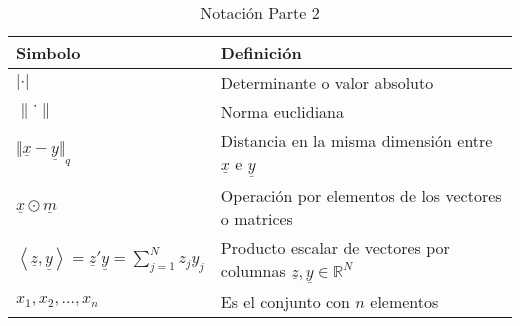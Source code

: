 \begin{table}[H]
    \begin{center}
        \begin{tabularx}{\textwidth}{|l|X|}
            \hline
            \textbf{Simbolo}                                                                                                     & \textbf{Definición}                                                                         \\
            \hline
            $ \lvert \cdot \rvert $                                                                                              & Determinante o valor absoluto                                                               \\
            $ \left\lVert \cdot \right\rVert $                                                                                   & Norma euclidiana                                                                            \\
            $ {\Vert \underline{x} - \underline{y} \Vert}_{q} $                                                                  & Distancia en la misma dimensión entre $\underline{x}$ e $\underline{y}$                     \\
            $ \underline{x} \odot \underline{m} $                                                                                & Operación por elementos de los vectores o matrices                                          \\
            $ \left\langle \underline{z}, \underline{y} \right\rangle = \underline{z}' \underline{y} = \sum_{j=1}^{N}{z_j y_j} $ & Producto escalar de vectores por columnas $\underline{z}, \underline{y} \in \mathbb{R}^{N}$ \\
            $ {x_{1}, x_{2}, \ldots ,x_{n}} $                                                                                    & Es el conjunto con $n$ elementos                                                            \\

            \hline
        \end{tabularx}
        \caption{Notación Parte 2}
        \label{tab:nnotation-part-2}
    \end{center}
\end{table}


